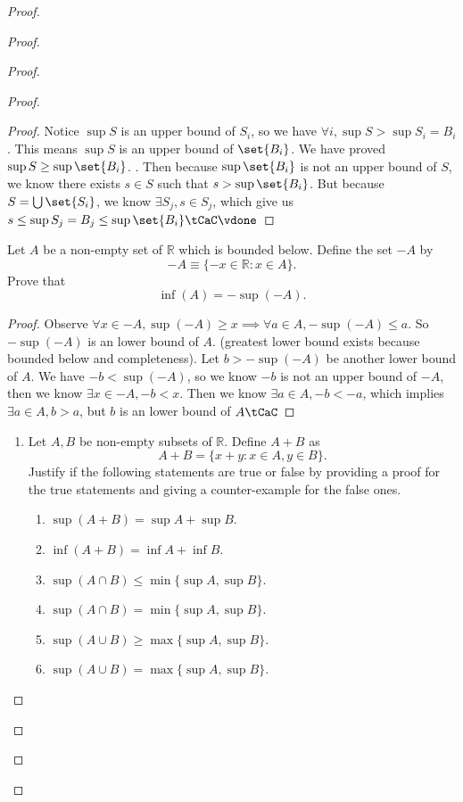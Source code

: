 \documentclass{report}
\begin{document}
\begin{proof}
\begin{proof}
\begin{proof}
\begin{proof}
\begin{proof}
  Notice $\sup S$ is an upper bound of $S_i$, so we have $\forall i, \sup S>\sup S_i=B_i$. This means $\sup S$ is an upper bound of $\set{B_i}$. We have proved $\sup S\geq \sup \set{B_i}$. . Then because $\sup \set{B_i}$ is not an upper bound of $S$, we know there exists  $s \in S$ such that $s>\sup \set{B_i}$. But because $S=\bigcup \set{S_i}$, we know $\exists S_j,s \in S_j$, which give us $s\leq \sup S_j=B_j\leq \sup \set{B_i}\tCaC\vdone$
\end{proof}
\begin{question}{}{}
Let \( A \) be a non-empty set of \( \mathbb{R} \) which is bounded below. Define the set \( -A \) by 
\[ -A \equiv \{-x \in \mathbb{R} : x \in A\}. \]
Prove that
\[ \inf(A) = -\sup(-A). \]
\end{question}
\begin{proof}
Observe $\forall x\in -A, \sup (-A)\geq  x\implies \forall a \in A, -\sup (-A)\leq  a$. So $-\sup (-A)$ is an lower bound of $A$.  (greatest lower bound exists because bounded below and completeness). Let $b>-\sup (-A)$ be another lower bound of $A$. We have $-b<\sup (-A)$, so we know $-b$ is not an upper bound of $-A$, then we know  $\exists x \in -A, -b<x$. Then we know $\exists a \in A, -b<-a$, which implies $\exists a \in A, b>a$, but $b$ is an lower bound of $A\tCaC$
\end{proof}
\begin{question}{}{}
\begin{enumerate}
    \item Let \( A, B \) be non-empty subsets of \( \mathbb{R} \). Define \( A+B \) as 
    \[ A+B = \{ x+y : x \in A, y \in B \}. \]
    Justify if the following statements are true or false by providing a proof for the true statements and giving a counter-example for the false ones.
    \begin{enumerate}
        \item \( \sup(A+B) = \sup A + \sup B \).
        \item \( \inf(A+B) = \inf A + \inf B \).
        \item \( \sup(A \cap B) \leq \min\{\sup A, \sup B\} \).
        \item \( \sup(A \cap B) = \min\{\sup A, \sup B\} \).
        \item \( \sup(A \cup B) \geq \max\{\sup A, \sup B\} \).
        \item \( \sup(A \cup B) = \max\{\sup A, \sup B\} \).
    \end{enumerate}

\end{enumerate}
\end{question}
\end{proof}
\end{proof}
\end{proof}
\end{proof}
\end{document}
